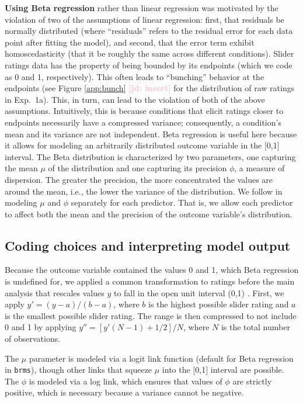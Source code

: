 \documentclass[11pt,fleqn]{article}
\newcommand{\jd}[1]{\textbf{\textcolor{Pink}{[jd: #1]}}}
\newcommand{\6}{\mbox{$[\hspace*{-.6mm}[$}}
\newcommand{\9}{\mbox{$]\hspace*{-.6mm}]$}}
\begin{document}
{\textbf{Using Beta regression} rather than linear regression was motivated by the violation of two of the  assumptions of linear regression: first, that residuals be normally distributed (where ``residuals'' refers to the residual error for each data point after fitting the model), and second, that the error term exhibit homoscedasticity (that it be roughly the same across different conditions). Slider ratings data has the property of being bounded by its endpoints (which we code as 0 and 1, respectively). This often leads to ``bunching'' behavior at the endpoints (see Figure \ref{app:bunch} \jd{insert} for the distribution of raw ratings in Exp.~1a). This, in turn, can lead to the violation of both of the above assumptions. Intuitively, this is because conditions that elicit ratings closer to endpoints necessarily have a compressed variance; consequently, a condition's mean and its variance are not independent. Beta regression is useful here because it allows for modeling an arbitrarily distributed outcome variable in the $[$0,1$]$ interval. The Beta distribution is characterized by two parameters, one capturing the mean $\mu$ of the distribution and one capturing its precision $\phi$, a measure of dispersion. The greater the precision, the more concentrated the values are around the mean, i.e., the lower the variance of the distribution.  We follow \citet{smithson2006} in modeling $\mu$ and $\phi$ separately for each predictor. That is, we allow each predictor to affect both the mean and the precision of the outcome variable's distribution. 

\subsection{Coding choices and interpreting model output}

Because the outcome variable contained the values 0 and 1, which Beta regression is undefined for, we applied a common transformation to ratings before the main analysis that rescales values $y$ to fall in the open unit interval (0,1)  \citep{smithson2006}. First, we apply $y' = (y-a)/(b-a)$, where $b$ is the highest possible slider rating and $a$ is the smallest possible slider rating. The range is then compressed to not include 0 and 1 by applying $y'' = [y'(N-1) + 1/2]/N$, where $N$ is the total number of observations.

The $\mu$ parameter is modeled via a logit link function (default for Beta regression in \verb|brms|), though other links that squeeze $\mu$ into the $[$0,1$]$ interval are possible. The $\phi$ is modeled via a log link, which ensures that values of $\phi$ are strictly positive, which is necessary because a variance cannot be negative. 

}
\end{document}
